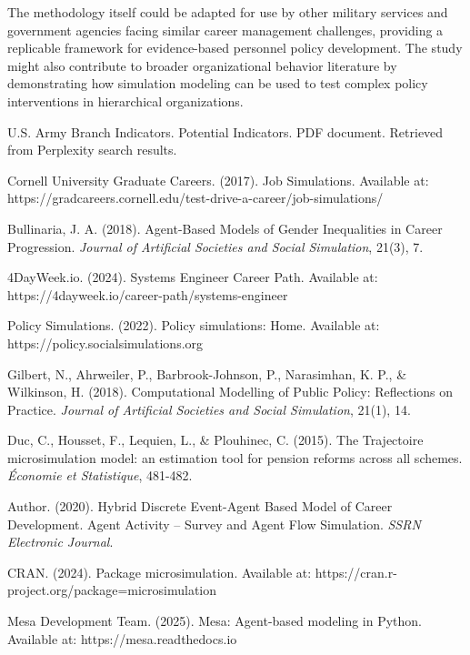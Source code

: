 \documentclass[main.tex]{subfiles}
\begin{document}
The methodology itself could be adapted for use by other military services and government agencies facing similar career management challenges, providing a replicable framework for evidence-based personnel policy development. The study might also contribute to broader organizational behavior literature by demonstrating how simulation modeling can be used to test complex policy interventions in hierarchical organizations.

\begin{thebibliography}{99}

U.S. Army Branch Indicators. Potential Indicators. PDF document. Retrieved from Perplexity search results.

Cornell University Graduate Careers. (2017). Job Simulations. Available at: https://gradcareers.cornell.edu/test-drive-a-career/job-simulations/

Bullinaria, J. A. (2018). Agent-Based Models of Gender Inequalities in Career Progression. \textit{Journal of Artificial Societies and Social Simulation}, 21(3), 7.

4DayWeek.io. (2024). Systems Engineer Career Path. Available at: https://4dayweek.io/career-path/systems-engineer

Policy Simulations. (2022). Policy simulations: Home. Available at: https://policy.socialsimulations.org

Gilbert, N., Ahrweiler, P., Barbrook-Johnson, P., Narasimhan, K. P., \& Wilkinson, H. (2018). Computational Modelling of Public Policy: Reflections on Practice. \textit{Journal of Artificial Societies and Social Simulation}, 21(1), 14.

Duc, C., Housset, F., Lequien, L., \& Plouhinec, C. (2015). The Trajectoire microsimulation model: an estimation tool for pension reforms across all schemes. \textit{Économie et Statistique}, 481-482.

Author. (2020). Hybrid Discrete Event-Agent Based Model of Career Development. Agent Activity – Survey and Agent Flow Simulation. \textit{SSRN Electronic Journal}.

CRAN. (2024). Package microsimulation. Available at: https://cran.r-project.org/package=microsimulation

Mesa Development Team. (2025). Mesa: Agent-based modeling in Python. Available at: https://mesa.readthedocs.io


\end{thebibliography}
\end{document}
